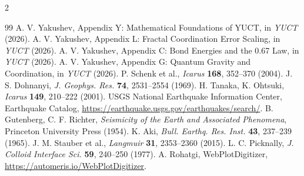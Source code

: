 \documentclass[11pt,a4paper]{article}
\begin{document}
\begin{multicols}{2}
		\begin{thebibliography}{99}
			 A. V. Yakushev, Appendix Y: Mathematical Foundations of YUCT, in \emph{YUCT} (2026).
			 A. V. Yakushev, Appendix L: Fractal Coordination Error Scaling, in \emph{YUCT} (2026).
			 A. V. Yakushev, Appendix C: Bond Energies and the 0.67 Law, in \emph{YUCT} (2026).
			 A. V. Yakushev, Appendix G: Quantum Gravity and Coordination, in \emph{YUCT} (2026).
			 P. Schenk et al., \emph{Icarus} \textbf{168}, 352–370 (2004).
			 J. S. Dohnanyi, \emph{J. Geophys. Res.} \textbf{74}, 2531–2554 (1969).
			 H. Tanaka, K. Ohtsuki, \emph{Icarus} \textbf{149}, 210–222 (2001).
			 USGS National Earthquake Information Center, Earthquake Catalog, \url{https://earthquake.usgs.gov/earthquakes/search/}.
			 B. Gutenberg, C. F. Richter, \emph{Seismicity of the Earth and Associated Phenomena}, Princeton University Press (1954).
			 K. Aki, \emph{Bull. Earthq. Res. Inst.} \textbf{43}, 237–239 (1965).
			 J. M. Stauber et al., \emph{Langmuir} \textbf{31}, 2353–2360 (2015).
			 L. C. Picknally, \emph{J. Colloid Interface Sci.} \textbf{59}, 240–250 (1977).
			 A. Rohatgi, WebPlotDigitizer, \url{https://automeris.io/WebPlotDigitizer}.
		\end{thebibliography}
		
	\end{multicols}
\end{document}
